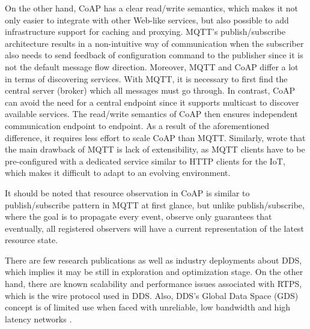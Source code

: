 On the other hand, CoAP has a clear read/write semantics, which makes it not only easier to integrate with other Web-like services, but also possible to add infrastructure support for caching and proxying. MQTT's publish/subscribe architecture results in a non-intuitive way of communication when the subscriber also needs to send feedback of configuration command to the publisher since it is not the default message flow direction. Moreover, MQTT and CoAP differ a lot in terms of discovering services. With MQTT, it is necessary to first find the central server (broker) which all messages must go through. In contrast, CoAP can avoid the need for a central endpoint since it supports multicast to discover available services. The read/write semantics of CoAP then ensures independent communication endpoint to endpoint. As a result of the aforementioned difference, it requires less effort to scale CoAP than MQTT. Similarly, \textcite{kovatsch2015scalable} wrote that the main drawback of MQTT is lack of extensibility, as MQTT clients have to be pre-configured with a dedicated service similar to HTTP clients for the IoT, which makes it difficult to adapt to an evolving environment.

It should be noted that resource observation in CoAP is similar to publish/subscribe pattern in MQTT at first glance, but unlike publish/subscribe, where the goal is to propagate every event, observe only guarantees that eventually, all registered observers will have a current representation of the latest resource state. 

There are few research publications as well as industry deployments about DDS, which implies it may be still in exploration and optimization stage. On the other hand, there are known scalability \autocite{esposito2011data} and performance \autocite{sanchez2011bloom} issues associated with RTPS, which is the wire protocol used in DDS. Also, DDS's Global Data Space (GDS) concept is of limited use when faced with unreliable, low bandwidth and high latency networks \autocite{7396558}. 


